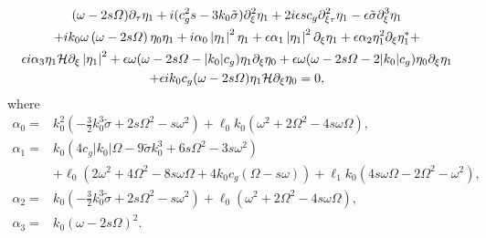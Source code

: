 \documentclass{JFM_Style/jfm}
\begin{document}
\begin{multline}
(\omega-2s\varOmega)\partial_{\tau}\eta_{1} + i(c_{g}^{2}s-3k_{0}\tilde{\sigma})\partial_{\xi}^{2}\eta_{1} + 2i\epsilon s c_{g}\partial^{2}_{\xi\tau}\eta_{1} - \epsilon\tilde{\sigma} \partial^{3}_{\xi}\eta_{1} \\
+ ik_{0}\omega\left(\omega-2s\varOmega\right)\eta_{0}\eta_{1} +
i \alpha_{0}\left|\eta_{1}\right|^{2}\eta_{1}
+ \epsilon\alpha_{1}\left|\eta_{1}\right|^{2}\partial_{\xi}\eta_{1}
+ \epsilon\alpha_{2}\eta_{1}^{2}\partial_{\xi}\eta^{\ast}_{1} + \\
\epsilon i\alpha_{3}\eta_{1}\mathcal{H}\partial_{\xi}\left|\eta_{1}\right|^{2}
 + \epsilon \omega(\omega-2s\varOmega-|k_{0}|c_{g})\eta_{1}\partial_{\xi}\eta_{0} + \epsilon\omega(\omega-2s\varOmega-2|k_{0}|c_{g})\eta_{0}\partial_{\xi}\eta_{1} \\
+ \epsilon ik_{0}c_{g}(\omega-2s\varOmega)\eta_{1}\mathcal{H}\partial_{\xi}\eta_{0} = 0,
\label{mnls}
\end{multline}
where
\begin{align*}
\alpha_{0} = & k_{0}^{2}\left(-\frac{3}{2}k_{0}^{3}\tilde{\sigma} + 2s\Omega^{2}-s\omega^{2}\right) + \ell_{0}k_{0}\left(\omega^{2}+2\Omega^{2}-4s\omega\Omega\right),\\
\alpha_{1} = & k_{0}\left(4c_{g}|k_{0}|\Omega - 9\tilde{\sigma}k_{0}^{3}+6s\Omega^{2}-3s\omega^{2}\right) \\
& + \ell_{0} \left(2\omega^{2}+4\Omega^{2}-8s\omega\Omega+4k_{0}c_{g}(\Omega-s\omega)\right) + \ell_{1}k_{0}\left(4s\omega\Omega-2\Omega^{2}-\omega^{2}\right),\\
\alpha_{2} = & k_{0}\left(-\frac{3}{2}k_{0}^{3}\tilde{\sigma}+2s\Omega^{2}-s\omega^{2}\right)  + \ell_{0}\left(\omega^{2} + 2\Omega^{2}-4s\omega\Omega\right),\\
\alpha_{3} = & k_{0}\left(\omega-2s\Omega\right)^{2}.
\end{align*}
\end{document}
